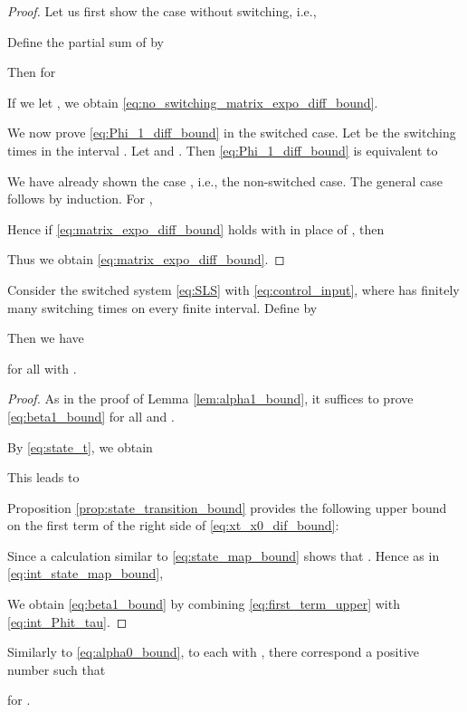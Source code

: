 \documentclass[a4, 11pt]{article}
\begin{document}
\begin{proof}
Let us first show the case without switching, i.e.,

Define the partial sum  of  by

Then for 

If we let , we obtain \eqref{eq:no_switching_matrix_expo_diff_bound}.

We now prove \eqref{eq:Phi_1_diff_bound}
in the switched case.
Let  be the switching times in the interval .
Let  and .
Then \eqref{eq:Phi_1_diff_bound} is equivalent to


We have already shown the case , i.e., the non-switched case.
The general case follows by induction. For ,

Hence if \eqref{eq:matrix_expo_diff_bound} holds with
 in place of , then

Thus we obtain \eqref{eq:matrix_expo_diff_bound}.
\end{proof}

\begin{lemma}
\label{lem:beta1_bound}
Consider the switched system \eqref{eq:SLS} with \eqref{eq:control_input}, 
where  has finitely many switching times
on every finite interval.
Define  by

Then we have

for all  with 
.
\end{lemma}
\begin{proof}
As in the proof of Lemma \ref{lem:alpha1_bound}, it suffices to prove
\eqref{eq:beta1_bound} for all 
 and 
.

By \eqref{eq:state_t}, we obtain

This leads to


Proposition \ref{prop:state_transition_bound} provides
the following upper bound on the first term of the right side of 
\eqref{eq:xt_x0_dif_bound}:


Since a
calculation similar to \eqref{eq:state_map_bound} shows that
. 
Hence as in \eqref{eq:int_state_map_bound},



We obtain \eqref{eq:beta1_bound} by
combining \eqref{eq:first_term_upper}
with \eqref{eq:int_Phit_tau}.
\end{proof}

Similarly to \eqref{eq:alpha0_bound},
to each  with , 
there correspond a positive number
 such that

for .
\end{document}
